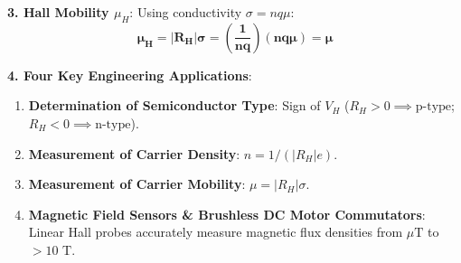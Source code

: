 \begin{theorysol}
\textbf{3. Hall Mobility $\mu_H$}:
Using conductivity $\sigma = n q \mu$:
\begin{equation}
\mathbf{\mu_H = |R_H| \sigma = \left(\frac{1}{n q}\right)(n q \mu) = \mu}
\end{equation}

\textbf{4. Four Key Engineering Applications}:
\begin{enumerate}
    \item \textbf{Determination of Semiconductor Type}: Sign of $V_H$ ($R_H > 0 \implies \text{p-type}$; $R_H < 0 \implies \text{n-type}$).
    \item \textbf{Measurement of Carrier Density}: $n = 1/(|R_H|e)$.
    \item \textbf{Measurement of Carrier Mobility}: $\mu = |R_H|\sigma$.
    \item \textbf{Magnetic Field Sensors \& Brushless DC Motor Commutators}: Linear Hall probes accurately measure magnetic flux densities from $\mu\text{T}$ to $> 10\text{ T}$.
\end{enumerate}

\end{theorysol}
\vspace{4mm}


